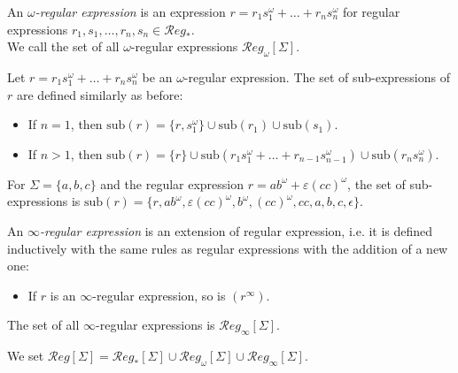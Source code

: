 \vspace{10pt}

\begin{defn}
	An \emph{$\omega$-regular expression} is an expression $r = r_1 s_1^\omega + \dots + r_n s_n^\omega$ for regular expressions $r_1, s_1, \dots, r_n, s_n \in \mathcal{R}eg_*$.\\
	We call the set of all $\omega$-regular expressions $\mathcal{R}eg_\omega[\Sigma]$.
\end{defn}

\begin{defn}
	Let $r = r_1 s_1^\omega + \dots + r_n s_n^\omega$ be an $\omega$-regular expression. The set of sub-expressions of $r$ are defined similarly as before:
	\begin{itemize}
		\item If $n = 1$, then $\text{sub}(r) = \{r, s_1^\omega\} \cup \text{sub}(r_1) \cup \text{sub}(s_1)$.
		\item If $n > 1$, then $\text{sub}(r) = \{r\} \cup \text{sub}(r_1 s_1^\omega + \dots + r_{n-1} s_{n-1}^\omega) \cup \text{sub}(r_n s_n^\omega)$.
	\end{itemize}
\end{defn}

\begin{exmp}
	For $\Sigma = \{a, b, c\}$ and the regular expression $r = ab^\omega + \varepsilon (cc)^\omega$, the set of sub-expressions is $\text{sub}(r) = \{r, ab^\omega, \varepsilon (cc)^\omega, b^\omega, (cc)^\omega, cc, a, b, c, \epsilon \}$.
\end{exmp}

\vspace*{10pt}

\begin{defn}
	An \emph{$\infty$-regular expression} is an extension of regular expression, i.e. it is defined inductively with the same rules as regular expressions with the addition of a new one:
	\begin{itemize}
		\item If $r$ is an $\infty$-regular expression, so is $(r^\infty)$.
	\end{itemize}
	The set of all $\infty$-regular expressions is $\mathcal{R}eg_\infty[\Sigma]$.
\end{defn}

\begin{defn}
	We set $\mathcal{R}eg[\Sigma] = \mathcal{R}eg_*[\Sigma] \cup \mathcal{R}eg_\omega[\Sigma] \cup \mathcal{R}eg_\infty[\Sigma]$.
\end{defn}

